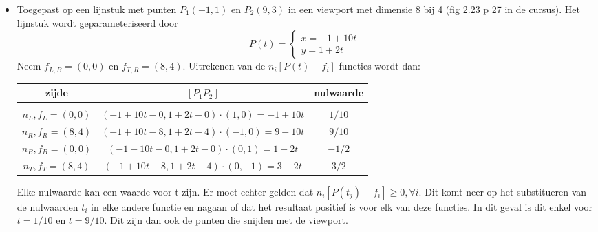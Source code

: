 \documentclass{report}
\begin{document}
\begin{enumerate}
{\begin{itemize}
			\item Toegepast op een lijnstuk met punten $P_1(-1, 1)$ en $P_2(9, 3)$ in een viewport met dimensie 8 bij 4 (fig 2.23 p 27 in de cursus). Het lijnstuk wordt geparameteriseerd door $$P(t) = \begin{cases}
			      x = -1 + 10t \\
			      y = 1 + 2t
			\end{cases}$$
			Neem $f_{L, B} = (0, 0)$ en $f_{T, R} = (8, 4)$. Uitrekenen van de $n_i[P(t) - f_i]$ functies wordt dan:
			\begin{table}[h]
				\centering
				\begin{tabular}{c | c | c}
					zijde               & $[P_1P_2]$                                           & nulwaarde \\ 
					\hline 
					\\
					$n_L, f_L = (0, 0)$ & $(-1 + 10t - 0, 1 + 2t - 0) \cdot (1, 0) = -1 + 10t$ & $1/10$    \\
					$n_R, f_R = (8, 4)$ & $(-1 + 10t - 8, 1 + 2t - 4) \cdot (-1, 0) = 9 - 10t$ & $9/10$    \\
					$n_B, f_B = (0, 0)$ & $(-1 + 10t - 0, 1 + 2t - 0) \cdot (0, 1) =  1 + 2t$  & $-1/2$    \\
					$n_T, f_T = (8, 4)$ & $(-1 + 10t - 8, 1 + 2t - 4) \cdot (0, -1) = 3 - 2t$  & $3/2$     \\
				\end{tabular}
			\end{table}
			Elke nulwaarde kan een waarde voor t zijn. 	Er moet echter gelden dat $n_i[P(t_j) - f_i] \geq 0, \forall i$. Dit komt neer op het substitueren van de nulwaarden $t_i$ in elke andere functie en nagaan of dat het resultaat positief is voor elk van deze functies. In dit geval is dit enkel voor $t = 1/10$ en $t = 9/10$. Dit zijn dan ook de punten die snijden met de viewport.
		\end{itemize}
	}
			
\end{enumerate}
\end{document}
